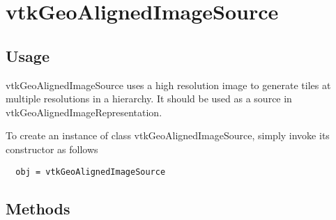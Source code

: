\section{vtkGeoAlignedImageSource}

\subsection{Usage}

 vtkGeoAlignedImageSource uses a high resolution image to generate tiles
 at multiple resolutions in a hierarchy. It should be used as a source in
 vtkGeoAlignedImageRepresentation.

To create an instance of class vtkGeoAlignedImageSource, simply
invoke its constructor as follows
\begin{verbatim}
  obj = vtkGeoAlignedImageSource
\end{verbatim}
\subsection{Methods}

